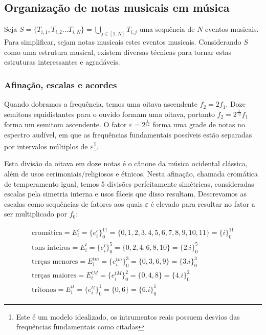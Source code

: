 \clearpage
\subsection{Organização de notas musicais em música}
Seja $ S=\{T_{i,1},T_{i,2}...T_{i,N}\} =\bigcup_{j \in [1,N]} T_{i,j} $ uma sequência de $N$ eventos
musicais. Para simplificar, sejam notas musicais estes eventos musicais.
Considerando $S$ como uma estrutura musical, existem diversas técnicas
para tornar estas estruturas interessantes e agradáveis.

\subsubsection{Afinação, escalas e acordes}
Quando dobramos a frequência, temos uma oitava ascendente $f_2=2f_1$.
Doze semitons equidistantes para o ouvido formam uma oitava,
portanto $f_2=2^{\frac{1}{12}}f_1$ forma um semitom ascendente.
O fator $\varepsilon=2^{\frac{1}{12}}$ forma uma grade de notas
no espectro audível, em que as frequências fundamentais possíveis
estão separadas por intervalos múltiplos de $\varepsilon$\footnote{Este
é um modelo idealizado, os intrumentos reais possuem desvios das frequências
fundamentais como citadas}.

Esta divisão da oitava em doze notas é o cânone da música ocidental clássica,
além de usos cerimoniais/religiosos e étnicos. Nesta afinação, chamada cromática
de temperamento igual, temos 5 divisões perfeitamente simétricas, consideradas
escalas pela simetria interna e usos fáceis que disso resultam. Descrevamos
as escalas como sequências de fatores aos quais $\varepsilon$ é elevado para resultar
no fator a ser multiplicado por $f_0$:

\begin{equation}
\begin{split}
\text{cromática} = E_i^c = \{e_i^c\}_0^{11} =  \{0,1,2,3,4,5,6,7,8,9,10,11\} = \{i\}_0^{11}\\
\text{tons inteiros} = E_i^t = \{e_i^t\}_0^{5} = \{0,2,4,6,8,10\} = \{2.i\}_0^{5} \\
\text{terças menores} = E_i^{tm} = \{e_i^{tm}\}_0^{3} = \{0,3,6,9\} = \{3.i\}_0^3 \\
\text{terças maiores} = E_i^{tM} = \{e_i^{tM}\}_0^{2} = \{0,4,8\} = \{4.i\}_0^2\\
\text{trítonos} = E_i^{tt} = \{e_i^{tt}\}_0^{1} = \{ 0, 6 \} = \{6.i\}_0^1
\end{split}
\end{equation}

